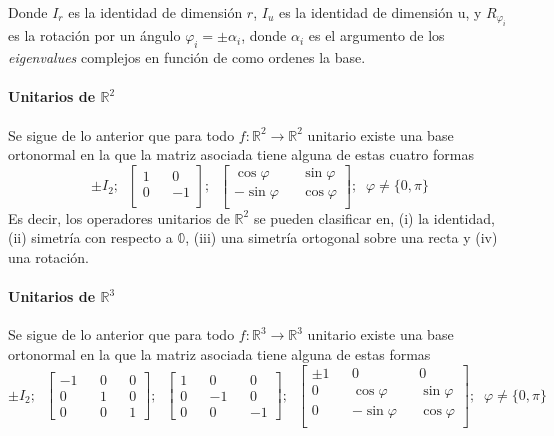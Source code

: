 \documentclass{preset}
\begin{document}
Donde $I_r$ es la identidad de dimensión $r$, $I_u$ es la identidad de dimensión u, y $R_{\varphi_i}$ es la rotación por un ángulo $\varphi_i=\pm \alpha_i$, donde $\alpha_i$ es el argumento de los \textit{eigenvalues} complejos en función de como ordenes la base.

\vspace{-5pt}
\paragraph{Unitarios de $\mathbb{R}^2$}

Se sigue de lo anterior que para todo $f: \mathbb{R}^2 \rightarrow \mathbb{R}^2$ unitario existe una base ortonormal en la que la matriz asociada tiene alguna de estas cuatro formas
\vspace{-7pt}
\[\pm I_2; \;\; \left[\begin{matrix}
1 && 0  \\
0 && -1\\
\end{matrix}\right]; \;\;
\left[\begin{matrix}
\cos{\varphi} && \sin{\varphi}  \\
-\sin{\varphi} && \cos{\varphi}\\
\end{matrix}\right]; \;\; \varphi \neq \{0,\pi\}\]
Es decir, los operadores unitarios de $\mathbb{R}^2$ se pueden clasificar en, (i) la identidad, (ii) simetría con respecto a $\mathbb{0}$, (iii) una simetría ortogonal sobre una recta y (iv) una rotación.

\vspace{-5pt}
\paragraph{Unitarios de $\mathbb{R}^3$}

Se sigue de lo anterior que para todo $f: \mathbb{R}^3 \rightarrow \mathbb{R}^3$ unitario existe una base ortonormal en la que la matriz asociada tiene alguna de estas formas
\[\pm I_2; \;\;\left[\begin{matrix}
-1 && 0  && 0\\
0 && 1 && 0\\
0 && 0 && 1
\end{matrix}\right]; \;\;
\left[\begin{matrix}
1 && 0  && 0\\
0 && -1 && 0\\
0 && 0 && -1
\end{matrix}\right]; \;\;
\left[\begin{matrix}
\pm 1 && 0&& 0\\
0&&\cos{\varphi} && \sin{\varphi}  \\
0&&-\sin{\varphi} && \cos{\varphi}\\
\end{matrix}\right]; \;\;\varphi \neq \{0,\pi\}\]
\end{document}
